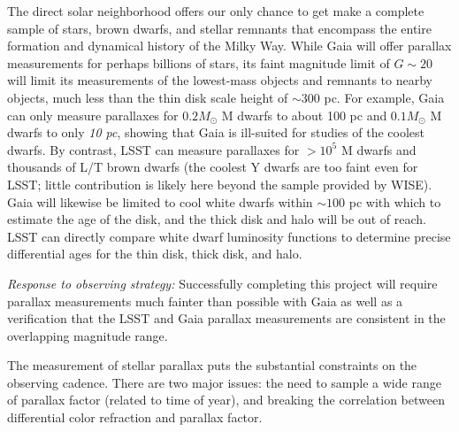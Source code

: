 The direct solar neighborhood offers our only chance to get make a complete sample of stars, brown dwarfs, and stellar remnants that encompass the entire formation and dynamical history of the Milky Way. While Gaia will offer parallax measurements for perhaps billions of stars, its faint magnitude limit of $G\sim 20$ will limit its measurements of the lowest-mass objects
and remnants to nearby objects, much less than the thin disk scale height of $\sim 300$ pc. For example, Gaia can only measure parallaxes for $0.2 M_{\odot}$ M dwarfs to about 100 pc
and $0.1 M_{\odot}$ M dwarfs to only \emph{10 pc}, showing that Gaia is ill-suited for studies of the coolest dwarfs. By contrast, LSST can measure parallaxes for $> 10^5$ M dwarfs and thousands of L/T brown dwarfs (the coolest Y dwarfs are too faint even for LSST; little contribution is likely here beyond the sample provided by WISE). Gaia will likewise be limited to cool white dwarfs within $\sim 100$ pc with which to estimate the age of the disk, and the thick disk and halo will be out of reach. LSST can directly compare white dwarf luminosity functions to determine precise differential ages for the thin disk, thick disk, and halo.

{\it Response to observing strategy:} Successfully completing this project will require parallax measurements much fainter than possible with Gaia as well as a verification that the LSST and Gaia parallax measurements are consistent in the overlapping magnitude range.

The measurement of stellar parallax puts the substantial constraints on the observing cadence. There are two major issues: the need to sample a wide range of parallax factor (related to time of year), and breaking the correlation between differential color refraction and parallax factor.

